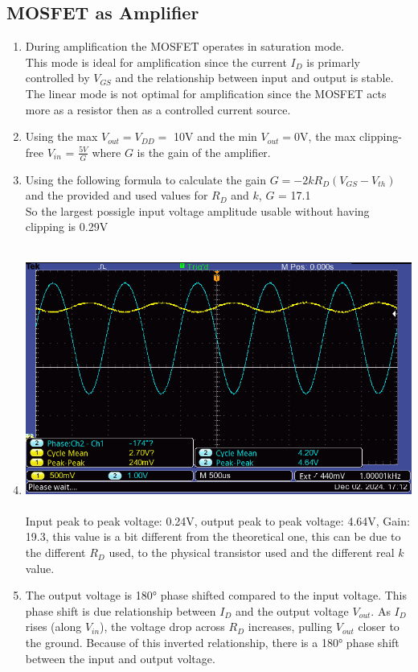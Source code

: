 \documentclass{article}
\begin{document}
		\subsection{MOSFET as Amplifier}
			\begin{enumerate}
				\item  During amplification the MOSFET operates in saturation mode.\\
				This mode is ideal for amplification since the current \(I_D\) is primarly controlled by \(V_{GS}\) and the relationship between input and output is stable. The linear mode is not optimal for amplification since the MOSFET acts more as a resistor then as a controlled current source.
				
				\item Using the max \(V_{out} = V_{DD} =\) 10V and the min \(V_{out} =\)0V, the max clipping-free \(V_{in}\) = \(\frac{5V}{G}\) where \(G\) is the gain of the amplifier. 
				\item 
				Using the following formula to calculate the gain \(G = -2k R_D (V_{GS}-V_{th})\) and the provided and used values for \(R_D\) and \(k\), \(G\) =  17.1\\
				So the largest possigle input voltage amplitude usable without having clipping is 0.29V\\\\
				\pagebreak
				\item \includegraphics[scale=0.5]{F0011TEK}\\\\
				Input peak to peak voltage: 0.24V, output peak to peak voltage: 4.64V, Gain: 19.3, this value is a bit different from the theoretical one, this can be due to the different \(R_D\) used, to the physical transistor used and the different real \(k\) value.
				\item The output voltage is 180° phase shifted compared to the input voltage. This phase shift is due relationship between \(I_D\) and the output voltage \(V_{out}\). As \(I_D\) rises (along \(V_{in}\)), the voltage drop across \(R_D\) increases, pulling \(V_{out}\) closer to the ground. Because of this inverted relationship, there is a 180° phase shift between the input and output voltage.
				
			\end{enumerate}	\pagebreak
	
\end{document}
